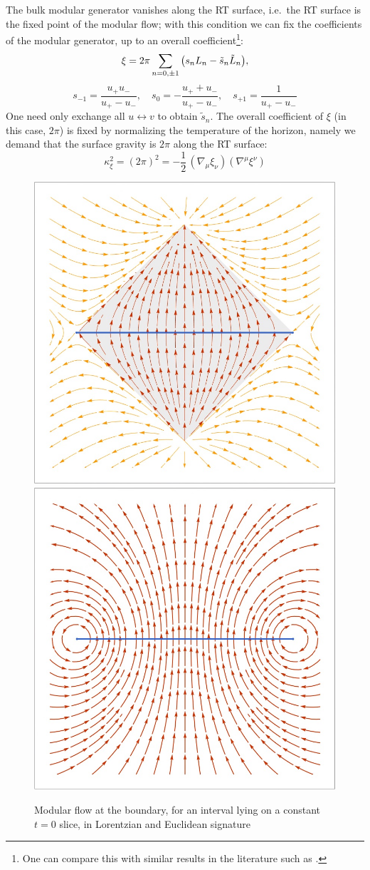 \documentclass[11pt,a4paper]{article}
\begin{document}
	The bulk modular generator vanishes along the RT surface, i.e.~the RT surface is the fixed point of the modular flow; with this condition we can fix the coefficients of the modular generator, up to an overall coefficient\footnote{
		One can compare this with similar results in the literature such as \cite{Lashkari:2016idm,Czech:2019vih,Apolo:2020qjm}. 
	}:
	\begin{equation}
		\xi = 2\pi \sum_{n=0,\pm 1} \pqty{
				s_n L_n - \tilde{s}_n \tilde{L}_n
			},
	\end{equation}
	\begin{equation}
		s_{-1} = \frac{u_+ u_-}{u_+ - u_-},\quad
		s_0 = - \frac{u_+ + u_-}{u_+ - u_-},\quad
		s_{+1} = \frac{1}{u_+ - u_-}
	\end{equation}
	One need only exchange all $u\leftrightarrow v$ to obtain $\tilde{s}_n$. The overall coefficient of $\xi$ (in this case, $2\pi$) is fixed by normalizing the temperature of the horizon, namely we demand that the surface gravity is $2\pi$ along the RT surface:
	\begin{equation}
		\kappa_\xi^2
		= (2\pi)^2
		= -\frac{1}{2}\,
			(\nabla_{\mu} \xi_{\nu})
			(\nabla^{\mu} \xi^{\nu})
	\end{equation}
	
	\begin{figure}[!ht]
	\centering
	\includegraphics[width=.4\linewidth]{img/modFlowLorentzian.png}
	\hspace{2em}
	\includegraphics[width=.4\linewidth]{img/modFlowEuclidean.png}
	\caption{Modular flow at the boundary, for an interval lying on a constant $t = 0$ slice, in Lorentzian and Euclidean signature}
	\end{figure}
	
\end{document}
